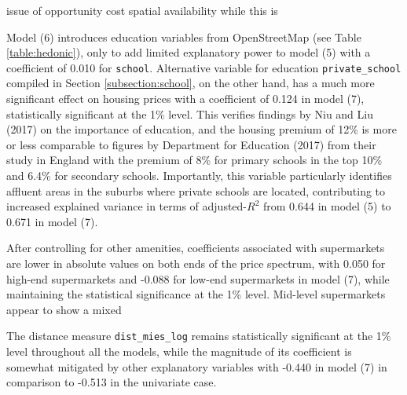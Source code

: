 \documentclass{article}
\begin{document}
issue of opportunity cost spatial availability 
while this is 

Model (6) introduces education variables from OpenStreetMap (see Table \ref{table:hedonic}), only to add limited explanatory power to model (5) with a coefficient of 0.010 for \texttt{school}. Alternative variable for education \texttt{private\_school} compiled in Section \ref{subsection:school}, on the other hand, has a much more significant effect on housing prices with a coefficient of 0.124 in model (7), statistically significant at the 1\% level. This verifies findings by Niu and Liu (2017) on the importance of education, and the housing premium of 12\% is more or less comparable to figures by Department for Education (2017) from their study in England with the premium of 8\% for primary schools in the top 10\% and 6.4\% for secondary schools. Importantly, this variable particularly identifies affluent areas in the suburbs where private schools are located, contributing to increased explained variance in terms of adjusted-$R^2$ from 0.644 in model (5) to 0.671 in model (7).








After controlling for other amenities, coefficients associated with supermarkets are lower in absolute values on both ends of the price spectrum, with 0.050 for high-end supermarkets and -0.088 for low-end supermarkets in model (7), while maintaining the statistical significance at the 1\% level. Mid-level supermarkets appear to show a mixed 


The distance measure \texttt{dist\_mies\_log} remains statistically significant at the 1\% level throughout all the models, while the magnitude of its coefficient is somewhat mitigated by other explanatory variables with -0.440 in model (7) in comparison to -0.513 in the univariate case.  
\end{document}
